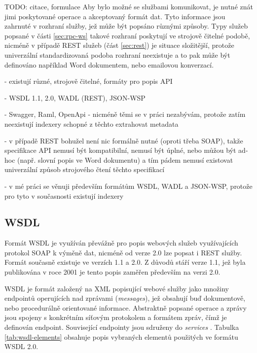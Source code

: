 \documentclass[czech,DP]{thesiskiv}
\begin{document}
TODO: citace, formulace
Aby bylo možné se službami komunikovat, je nutné znát jimi poskytované operace a akceptovaný formát dat. Tyto informace jsou zahrnuté v rozhraní služby, jež může být popsáno různými způsoby. Typy služeb popsané v části \ref{sec:rpc-ws} takové rozhraní poskytují ve strojově čitelné podobě, nicméně v případě REST služeb (část \ref{sec:rest}) je situace složitější, protože univerzální standardizovaná podoba rozhraní neexistuje a to pak může být definováno například Word dokumentem, nebo emailovou konverzací.

- existují různé, strojově čitelné, formáty pro popis API

- WSDL 1.1, 2.0, WADL (REST), JSON-WSP

- Swagger, Raml, OpenApi
	- nicméně těmi se v práci nezabývám, protože zatím neexistují indexery schopné z těchto extrahovat metadata

- v případě REST bohužel není nic formálně nutné (oproti třeba SOAP), takže specifikace API nemusí být kompatibilní, nemusí být úplné, nebo můžou být ad-hoc (např. slovní popis ve Word dokumentu) a tím pádem nemusí existovat univerzální způsob strojového čtení těchto specifikací

- v mé práci se věnuji především formátům WSDL, WADL a JSON-WSP, protože pro tyto v současnosti existují indexery

\subsection{WSDL}

Formát WSDL je využíván převážně pro popis webových služeb využívajících protokol SOAP k výměně dat, nicméně od verze 2.0 lze popsat i REST služby. Formát současně existuje ve verzích 1.1 a 2.0. Z důvodů stáří verze 1.1, jež byla publikována v roce 2001 je tento popis zaměřen především na verzi 2.0. 

WSDL je formát založený na XML popisující webové služby jako množiny endpointů operujících nad zprávami (\textit{messages}), jež obsahují buď dokumentově, nebo procedurálně orientované informace. Abstraktně popsané operace a zprávy jsou spojeny s konkrétním síťovým protokolem a formátem zpráv, čímž je definován endpoint. Související endpointy jsou sdruženy do \textit{services} \cite{wsdl2}. Tabulka \ref{tab:wsdl-elements} obsahuje popis vybraných elementů použitých ve formátu WSDL 2.0.
\end{document}
